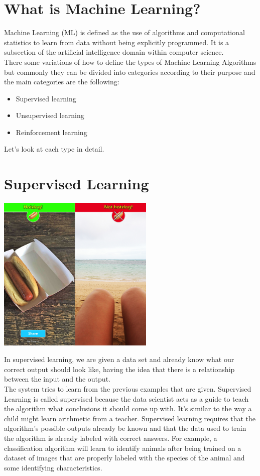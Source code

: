 \documentclass{42-en}
\begin{document}
\section*{What is Machine Learning?}

Machine Learning (ML) is defined as the use of algorithms and computational statistics to learn from data without being explicitly programmed. It is a subsection of the artificial intelligence domain within computer science.\\

There some variations of how to define the types of Machine Learning Algorithms but commonly they can be divided into categories according to their purpose and the main categories are the following:\\
\begin{itemize}
    \item Supervised learning
    \item Unsupervised learning
    \item Reinforcement learning
\end{itemize}
Let’s look at each type in detail.

\newpage

\section*{Supervised Learning}

\centerline{\includegraphics[width=75mm]{images/hotdogs_legs.jpg}}

In supervised learning, we are given a data set and already know what our correct output should look like, having the idea that there is a relationship between the input and the output.\\

The system tries to learn from the previous examples that are given. Supervised Learning is called supervised because the data scientist acts as a guide to teach the algorithm what conclusions it should come up with. It’s similar to the way a child might learn arithmetic from a teacher. Supervised learning requires that the algorithm’s possible outputs already be known and that the data used to train the algorithm is already labeled with correct answers. For example, a classification algorithm will learn to identify animals after being trained on a dataset of images that are properly labeled with the species of the animal and some identifying characteristics.\\
\end{document}
